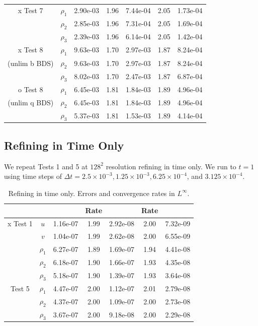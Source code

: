 \documentclass[final]{siamltex}
\begin{document}
\begin{table}[h]
\begin{center}
\begin{tabular}{ccccccc}
\hline
x Test 7            & $\rho_1$ & 2.90e-03 & 1.96 & 7.44e-04 & 2.05 & 1.73e-04 \\
                    & $\rho_2$ & 2.85e-03 & 1.96 & 7.31e-04 & 2.05 & 1.69e-04 \\
                    & $\rho_3$ & 2.39e-03 & 1.96 & 6.14e-04 & 2.05 & 1.42e-04 \\
\hline
x Test 8            & $\rho_1$ & 9.63e-03 & 1.70 & 2.97e-03 & 1.87 & 8.24e-04 \\
(unlim b BDS)       & $\rho_2$ & 9.63e-03 & 1.70 & 2.97e-03 & 1.87 & 8.24e-04 \\
                    & $\rho_3$ & 8.02e-03 & 1.70 & 2.47e-03 & 1.87 & 6.87e-04 \\
\hline
o Test 8            & $\rho_1$ & 6.45e-03 & 1.81 & 1.84e-03 & 1.89 & 4.96e-04 \\
(unlim q BDS)       & $\rho_2$ & 6.45e-03 & 1.81 & 1.84e-03 & 1.89 & 4.96e-04 \\
                    & $\rho_3$ & 5.37e-03 & 1.81 & 1.53e-03 & 1.89 & 4.14e-04
\end{tabular}
\end{center}
\end{table}

\subsection{Refining in Time Only}
We repeat Tests 1 and 5 at $128^2$ resolution refining in time only.  We run to $t=1$ using time steps
of $\Delta t = 2.5\times 10^{-3}, 1.25\times 10^{-3}, 6.25\times 10^{-4}$, and $3.125\times 10^{-4}$.
\begin{table}[h]
\begin{center}
\caption{Refining in time only.  Errors and convergence rates in $L^\infty$.}
\label{tab:Linf_time}
\begin{tabular}{ccccccc}
& & & Rate & & Rate & \\
\hline
x Test 1            & $u$      & 1.16e-07 & 1.99 & 2.92e-08 & 2.00 & 7.32e-09 \\
                    & $v$      & 1.04e-07 & 1.99 & 2.62e-08 & 2.00 & 6.55e-09 \\
                    & $\rho_1$ & 6.27e-07 & 1.89 & 1.69e-07 & 1.94 & 4.41e-08 \\
                    & $\rho_2$ & 6.18e-07 & 1.90 & 1.66e-07 & 1.93 & 4.35e-08 \\
                    & $\rho_3$ & 5.18e-07 & 1.90 & 1.39e-07 & 1.93 & 3.64e-08 \\
\hline
Test 5              & $\rho_1$ & 4.47e-07 & 2.00 & 1.12e-07 & 2.01 & 2.79e-08 \\
                    & $\rho_2$ & 4.37e-07 & 2.00 & 1.09e-07 & 2.00 & 2.73e-08 \\
                    & $\rho_3$ & 3.67e-07 & 2.00 & 9.18e-08 & 2.00 & 2.29e-08 \\
\end{tabular}
\end{center}
\end{table}
\end{document}
